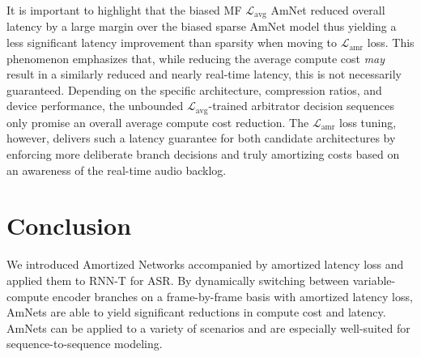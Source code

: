 \documentclass[a4paper]{article}
\begin{document}
It is important to highlight that the biased MF $\mathcal{L}_{\text{avg}}$ AmNet reduced overall latency by a large margin over the biased sparse AmNet model thus yielding a less significant latency improvement than sparsity when moving to $\mathcal{L}_{\text{amr}}$ loss. This phenomenon emphasizes that, while reducing the average compute cost \emph{may} result in a similarly reduced and nearly real-time latency, this is not necessarily guaranteed. Depending on the specific architecture, compression ratios, and device performance, the unbounded $\mathcal{L}_{\text{avg}}$-trained arbitrator decision sequences only promise an overall average compute cost reduction. The $\mathcal{L}_{\text{amr}}$ loss tuning, however, delivers such a latency guarantee for both candidate architectures by enforcing more deliberate branch decisions and truly amortizing costs based on an awareness of the real-time audio backlog.


\section{Conclusion}
\label{sec:conclusion}
We introduced Amortized Networks accompanied by amortized latency loss and applied them to RNN-T for ASR. By dynamically switching between variable-compute encoder branches on a frame-by-frame basis with amortized latency loss, AmNets are able to yield significant reductions in compute cost and latency. AmNets can be applied to a variety of scenarios and are especially well-suited for sequence-to-sequence modeling.


\clearpage
\newpage



\end{document}
